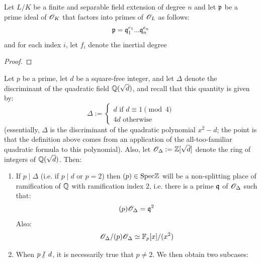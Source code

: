                 \begin{theorem}
                    Let $L/K$ be a finite and separable field extension of degree $n$ and let $\mathfrak{p}$ be a prime ideal of $\mathscr{O}_K$ that factors into primes of $\mathscr{O}_L$ as follows:
                        $$\mathfrak{p} = \mathfrak{q}_1^{e_1}...\mathfrak{q}_n^{e_n}$$
                    and for each index $i$, let $f_i$ denote the inertial degree 
                \end{theorem}
                    \begin{proof}
                        
                    \end{proof}
                \begin{corollary} \label{coro: ramification_quadratic_fields}
                    Let $p$ be a prime, let $d$ be a square-free integer, and let $\Delta$ denote the discriminant of the quadratic field $\mathbb{Q}(\sqrt{d})$, and recall that this quantity is given by:
                        $$
                            \Delta := 
                            \begin{cases}
                                \text{$d$ if $d \equiv 1 \pmod{4}$}
                                \\
                                \text{$4d$ otherwise}
                            \end{cases}
                        $$
                    (essentially, $\Delta$ is the discriminant of the quadratic polynomial $x^2 - d$; the point is that the definition above comes from an application of the all-too-familiar quadratic formula to this polynomial). Also, let $\mathscr{O}_{\Delta} := \mathbb{Z}[\sqrt{d}]$ denote the ring of integers of $\mathbb{Q}(\sqrt{d})$. Then:
                        \begin{enumerate}
                            \item If $p \mid \Delta$ (i.e. if $p \mid d$ or $p = 2$) then $(p) \in \mathrm{Spec} \mathbb{Z}$ will be a non-splitting place of ramification of $\mathbb{Q}$ with ramification index $2$, i.e. there is a prime $\mathfrak{q}$ of $\mathscr{O}_{\Delta}$ such that:
                                $$(p)\mathscr{O}_{\Delta} = \mathfrak{q}^2$$
                            Also:
                                $$\mathscr{O}_{\Delta}/(p)\mathscr{O}_{\Delta} \simeq \mathbb{F}_p[x]/(x^2)$$
                            \item When $p \hspace{-2pt}\not|\hspace{5pt} d$, it is necessarily true that $p 
                            \not = 2$. We then obtain two subcases:

\end{enumerate}
\end{corollary}
